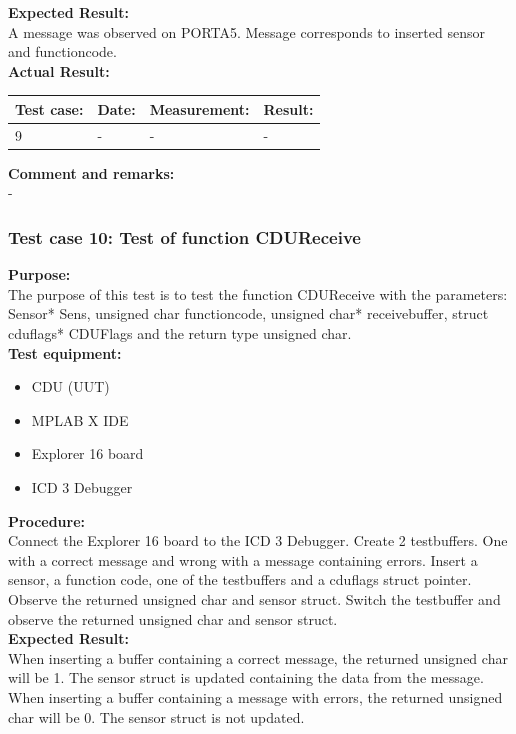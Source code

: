 \textbf{Expected Result:}\\
A message was observed on PORTA5. Message corresponds to inserted sensor and functioncode.\\

\textbf{Actual Result:}\\
\begin{table}[H]
\centering
\begin{tabular}{|p{2cm}|p{2cm}|p{3cm}|p{2cm}|}\hline
\textbf{Test case:} & \textbf{Date:} & \textbf{Measurement:} & \textbf{Result:} \\ \hline
9 & - & - & - \\ \hline
\end{tabular}
\end{table}

\textbf{Comment and remarks:}\\
-\\

\subsubsection{Test case 10: Test of function CDUReceive }
\textbf{Purpose:}\\
The purpose of this test is to test the function CDUReceive with the parameters: Sensor* Sens, unsigned char functioncode, unsigned char* receivebuffer, struct cduflags* CDUFlags and the return type unsigned char.\\

\textbf{Test equipment:}
\begin{itemize}
\item CDU (UUT)
\item MPLAB X IDE
\item Explorer 16 board
\item ICD 3 Debugger
\end{itemize}

\textbf{Procedure:}\\
Connect the Explorer 16 board to the ICD 3 Debugger. Create 2 testbuffers. One with a correct message and wrong with a message containing errors. Insert a sensor, a function code, one of the testbuffers and a cduflags struct pointer. Observe the returned unsigned char and sensor struct. Switch the testbuffer and observe the returned unsigned char and sensor struct.\\

\textbf{Expected Result:}\\
When inserting a buffer containing a correct message, the returned unsigned char will be 1. The sensor struct is updated containing the data from the message.\\
When inserting a buffer containing a message with errors, the returned unsigned char will be 0. The sensor struct is not updated.\\

